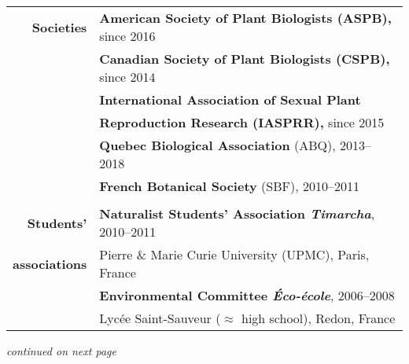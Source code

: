\documentclass[letterpaper,10pt]{article}
\begin{document}
\begin{tabular}{r|p{14cm}}

\textbf{Societies}

 & \textbf{American Society of Plant Biologists (ASPB),} since 2016
   \vspace{2mm} \\

 & \textbf{Canadian Society of Plant Biologists (CSPB),} since 2014
   \vspace{2mm} \\

 & \textbf{International Association of Sexual Plant} \\
 & \textbf{Reproduction Research (IASPRR),} since 2015
   \vspace{2mm} \\

 & \textbf{Quebec Biological Association} (ABQ), 2013--2018
   \vspace{2mm} \\

 & \textbf{French Botanical Society} (SBF), 2010--2011 \\

\multicolumn{2}{c}{} \\

\textbf{Students'}
  & \textbf{Naturalist Students' Association \emph{Timarcha}}, 2010--2011 \\
\textbf{associations}
  & Pierre \& Marie Curie University (UPMC), Paris, France
    \vspace{2mm} \\

  & \textbf{Environmental Committee \emph{Éco-école}}, 2006--2008 \\
  & Lycée Saint-Sauveur ($\approx$ high school), Redon, France \\

\end{tabular}

\vspace{3mm}
\hfill \emph{\small continued on next page}
\end{document}
